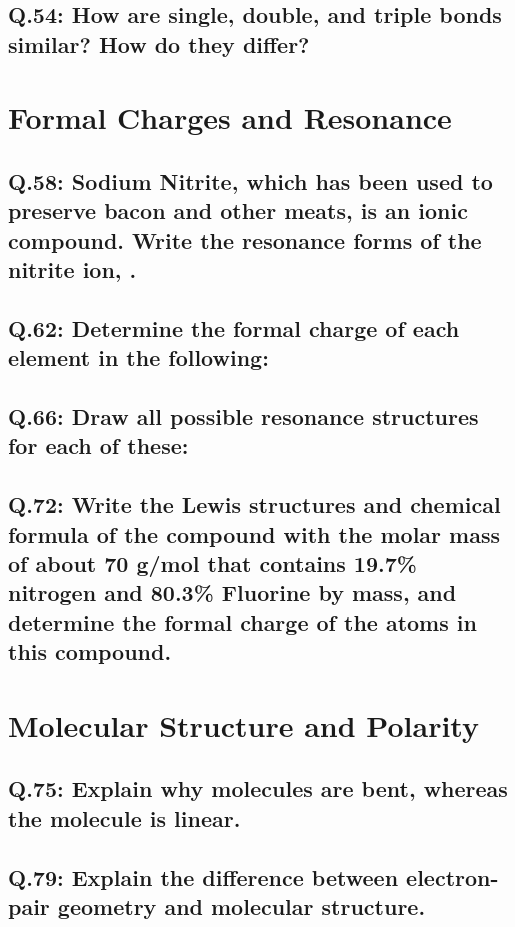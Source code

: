 \documentclass[11pt, letterpaper]{article}
\begin{document}
\subsection*{Q.54: How are single, double, and triple bonds similar? How do they differ?}



\section{Formal Charges and Resonance}

\subsection*{Q.58: Sodium Nitrite, which has been used to preserve bacon and other meats,
is an ionic compound. Write the resonance forms of the nitrite ion, .}

\subsection*{Q.62: Determine the formal charge of each element in the following:}

\subsection*{Q.66: Draw all possible resonance structures for each of these:}

\subsection*{Q.72: Write the Lewis structures and chemical formula of the compound with the molar
mass of about 70 g/mol that contains 19.7\% nitrogen and 80.3\% Fluorine by mass, and determine
the formal charge of the atoms in this compound.}


\section{Molecular Structure and Polarity}

\subsection*{Q.75: Explain why  molecules are bent, whereas the 
molecule is linear.}

\subsection*{Q.79: Explain the difference between electron-pair geometry and molecular structure.}
\end{document}
